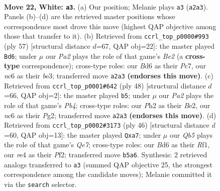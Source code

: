\documentclass[11pt]{article}
\begin{document}
\clearpage

\begin{figure}[p]\centering
\begin{subfigure}{0.46\textwidth}\centering
\resizebox{\linewidth}{!}{%
\newchessgame
\chessboard[
  setfen={r5k1/p4p1p/2nB2p1/1Q6/4r1q1/8/P4P1P/R6K w - - 2 22},
  showmover=false,
  pgfstyle=straightmove, color=movearrow, markmove={a2-a3}
]}
\caption{}
\end{subfigure}\hfill
\begin{subfigure}{0.46\textwidth}\centering
\resizebox{\linewidth}{!}{%
\newchessgame
\chessboard[
  setfen={r6k/2p1b1p1/4p3/8/8/2q1B2P/5PP1/1Q2RK2 b - - 1 29},
  showmover=false,
  pgfstyle=straightmove, color=movearrow, markmove={e7-d6}
]}
\caption{}
\end{subfigure}
\\[4pt]
\begin{subfigure}{0.46\textwidth}\centering
\resizebox{\linewidth}{!}{%
\newchessgame
\chessboard[
  setfen={q5k1/5p1p/4rnp1/4p3/1P6/7P/3QBPP1/3R2K1 w - - 1 25},
  showmover=false,
  pgfstyle=straightmove, color=movearrow, markmove={b4-b5}
]}
\caption{}
\end{subfigure}\hfill
\begin{subfigure}{0.46\textwidth}\centering
\resizebox{\linewidth}{!}{%
\newchessgame
\chessboard[
  setfen={5rk1/p3Qp1p/1p4p1/7q/5P2/8/PP3PP1/5RK1 w - - 0 24},
  showmover=false,
  pgfstyle=straightmove, color=movearrow, markmove={e7-a7}
]}
\caption{}
\end{subfigure}
\caption{\textbf{Move 22, White: \texttt{a3}.} (a) Our position; Melanie plays \texttt{a3} (\texttt{a2a3}). Panels (b)--(d) are the retrieved master positions whose correspondence most drove this move (highest QAP objective among those that transfer to it). (b) Retrieved from \texttt{ccrl\_top\_p0000\#993} (ply 57) [structural distance $d$=67, QAP obj=22]: the master played \texttt{Bd6}; under $\mu$ our \emph{Pa2} plays the role of that game's \emph{Be2} (a \textbf{cross-type} correspondence); cross-type roles: our \emph{B}d6 as their \emph{P}c7, our \emph{n}c6 as their \emph{b}e3; transferred move \texttt{a2a3} \textbf{(endorses this move)}. (c) Retrieved from \texttt{ccrl\_top\_p0001\#642} (ply 48) [structural distance $d$=66, QAP obj=2]: the master played \texttt{b5}; under $\mu$ our \emph{Pa2} plays the role of that game's \emph{Pb4}; cross-type roles: our \emph{P}h2 as their \emph{B}e2, our \emph{n}c6 as their \emph{P}g2; transferred move \texttt{a2a3} \textbf{(endorses this move)}. (d) Retrieved from \texttt{ccrl\_top\_p0002\#3173} (ply 46) [structural distance $d$=60, QAP obj=13]: the master played \texttt{Qxa7}; under $\mu$ our \emph{Qb5} plays the role of that game's \emph{Qe7}; cross-type roles: our \emph{B}d6 as their \emph{R}f1, our \emph{r}e4 as their \emph{P}f2; transferred move \texttt{b5a6}. Synthesis: 2 retrieved analogs transferred to \texttt{a3} (summed QAP objective 25, the strongest correspondence among the candidate moves); Melanie committed it via the \texttt{search} selector.}
\label{fig:thought-m42}
\end{figure}
\end{document}
